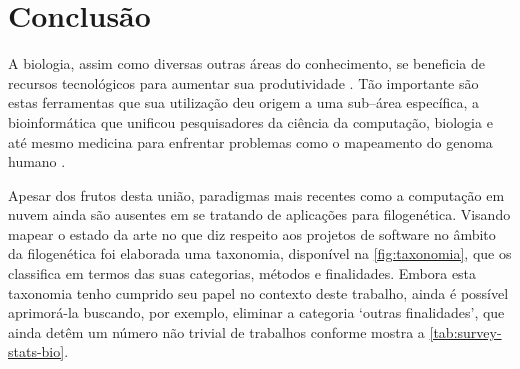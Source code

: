 \documentclass[english,brazilian]{UNISINOSmonografia} %
\begin{document}







\chapter{Conclusão}
\label{ch:conclusao}




A biologia, assim como diversas outras áreas do conhecimento, se beneficia de recursos tecnológicos para aumentar sua produtividade \cite{Denning2009}.
Tão importante são estas ferramentas que sua utilização deu origem a uma sub--área específica, a bioinformática que unificou pesquisadores da ciência da computação, biologia e até mesmo medicina para enfrentar problemas como o mapeamento do genoma humano \cite{Venter2001}.


Apesar dos frutos desta união, paradigmas mais recentes como a computação em nuvem ainda são ausentes em se tratando de aplicações para filogenética.
Visando mapear o estado da arte no que diz respeito aos projetos de software no âmbito da filogenética foi elaborada uma taxonomia, disponível na \autoref{fig:taxonomia}, que os classifica em termos das suas categorias, métodos e finalidades.
Embora esta taxonomia tenho cumprido seu papel no contexto deste trabalho, ainda é possível aprimorá-la buscando, por exemplo, eliminar a categoria \textquoteleft outras finalidades\textquoteright, que ainda detêm um número não trivial de trabalhos conforme mostra a \autoref{tab:survey-stats-bio}.
\end{document}
